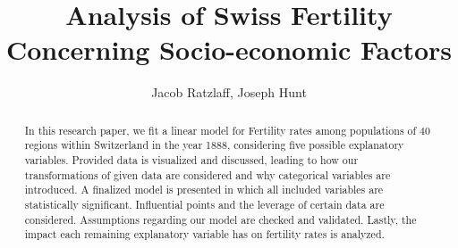 \documentclass[preprint,12pt]{elsarticle}
\begin{document}
\begin{frontmatter}


\title{Analysis of Swiss Fertility Concerning Socio-economic Factors}




\author{Jacob Ratzlaff, Joseph Hunt}

\address{Colorado School of Mines}

\begin{abstract}
\noindent In this research paper, we fit a linear model for Fertility rates among populations of 40 regions within Switzerland in the year 1888, considering five possible explanatory variables. Provided data is visualized and discussed, leading to how our transformations of given data are considered and why categorical variables are introduced. A finalized model is presented in which all included variables are statistically significant. Influential points and the leverage of certain data are considered. Assumptions regarding our model are checked and validated. Lastly, the impact each remaining explanatory variable has on fertility rates is analyzed.
\end{abstract}



\end{frontmatter}
\end{document}
